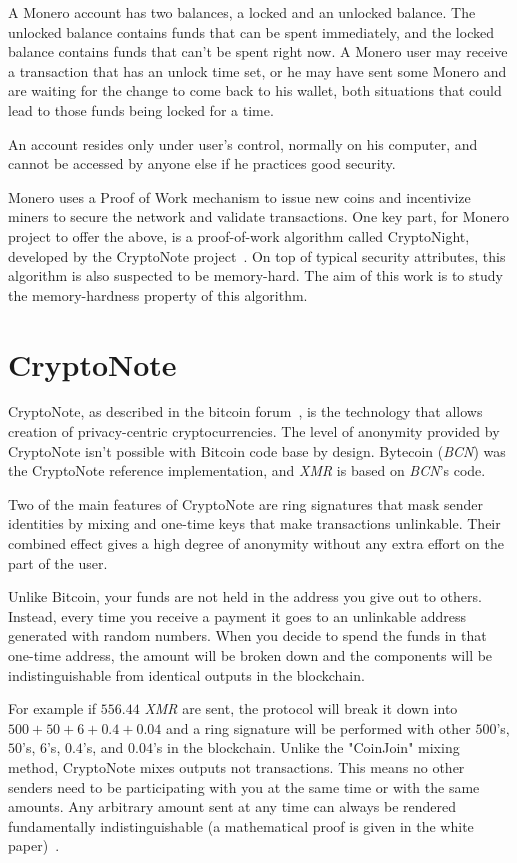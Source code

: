 A Monero account has two balances, a locked and an unlocked balance. The unlocked balance contains funds that can be spent immediately, and the locked balance contains funds that can't be spent right now. A Monero user may receive a transaction that has an unlock time set, or he may have sent some Monero and are waiting for the change to come back to his wallet, both situations that could lead to those funds being locked for a time.

An account resides only under user's control, normally on his computer, and cannot be accessed by anyone else if he practices good security.~\cite{getmonero}

Monero uses a Proof of Work mechanism to issue new coins and
incentivize miners to secure the network and validate transactions.
One key part, for Monero project to offer the above, is a proof-of-work algorithm called CryptoNight, developed by the CryptoNote
project~\cite{citeulike:14139412}. On top of typical security attributes, this algorithm is also suspected to be memory-hard. The aim of this work is to study the memory-hardness property of this algorithm.
%
\section{CryptoNote}
CryptoNote, as described in the bitcoin forum~\cite{btcforum}, is the technology that allows creation of privacy-centric cryptocurrencies. The level of anonymity provided by CryptoNote isn't possible with Bitcoin code base by design. Bytecoin (\emph{BCN}) was the CryptoNote reference implementation, and \emph{XMR} is based on \emph{BCN}'s code.

Two of the main features of CryptoNote are ring signatures that mask sender identities by mixing and one-time keys that make transactions unlinkable. Their combined effect gives a high degree of anonymity without any extra effort on the part of the user.

Unlike Bitcoin, your funds are not held in the address you give out to others. Instead, every time you receive a payment it goes to an unlinkable address generated with random numbers. When you decide to spend the funds in that one-time address, the amount will be broken down and the components will be indistinguishable from identical outputs in the blockchain.

For example if $556.44$ \emph{XMR} are sent, the protocol will break it down into $500 + 50 + 6 + 0.4 + 0.04$ and a ring signature will be performed with other $500$'s, $50$'s, $6$'s, $0.4$'s, and $0.04$'s in the blockchain. Unlike the "CoinJoin" mixing method, CryptoNote mixes outputs not transactions. This means no other senders need to be participating with you at the same time or with the same amounts. Any arbitrary amount sent at any time can always be rendered fundamentally indistinguishable (a mathematical proof is given in the white paper)~\cite{citeulike:14139412}.

